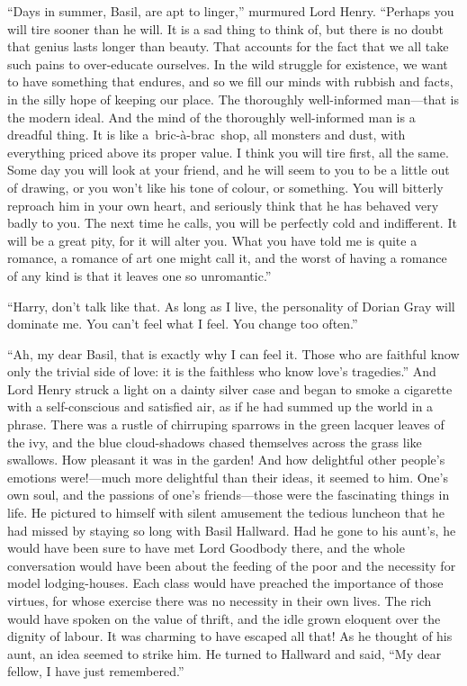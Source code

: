 “Days in summer, Basil, are apt to linger,” murmured Lord Henry. “Perhaps you will tire sooner than he will. It is a sad thing to think of, but there is no doubt that genius lasts longer than beauty. That accounts for the fact that we all take such pains to over-educate ourselves. In the wild struggle for existence, we want to have something that endures, and so we fill our minds with rubbish and facts, in the silly hope of keeping our place. The thoroughly well-informed man—that is the modern ideal. And the mind of the thoroughly well-informed man is a dreadful thing. It is like a bric-à-brac shop, all monsters and dust, with everything priced above its proper value. I think you will tire first, all the same. Some day you will look at your friend, and he will seem to you to be a little out of drawing, or you won’t like his tone of colour, or something. You will bitterly reproach him in your own heart, and seriously think that he has behaved very badly to you. The next time he calls, you will be perfectly cold and indifferent. It will be a great pity, for it will alter you. What you have told me is quite a romance, a romance of art one might call it, and the worst of having a romance of any kind is that it leaves one so unromantic.”

“Harry, don’t talk like that. As long as I live, the personality of Dorian Gray will dominate me. You can’t feel what I feel. You change too often.”

“Ah, my dear Basil, that is exactly why I can feel it. Those who are faithful know only the trivial side of love: it is the faithless who know love’s tragedies.” And Lord Henry struck a light on a dainty silver case and began to smoke a cigarette with a self-conscious and satisfied air, as if he had summed up the world in a phrase. There was a rustle of chirruping sparrows in the green lacquer leaves of the ivy, and the blue cloud-shadows chased themselves across the grass like swallows. How pleasant it was in the garden! And how delightful other people’s emotions were!—much more delightful than their ideas, it seemed to him. One’s own soul, and the passions of one’s friends—those were the fascinating things in life. He pictured to himself with silent amusement the tedious luncheon that he had missed by staying so long with Basil Hallward. Had he gone to his aunt’s, he would have been sure to have met Lord Goodbody there, and the whole conversation would have been about the feeding of the poor and the necessity for model lodging-houses. Each class would have preached the importance of those virtues, for whose exercise there was no necessity in their own lives. The rich would have spoken on the value of thrift, and the idle grown eloquent over the dignity of labour. It was charming to have escaped all that! As he thought of his aunt, an idea seemed to strike him. He turned to Hallward and said, “My dear fellow, I have just remembered.”

